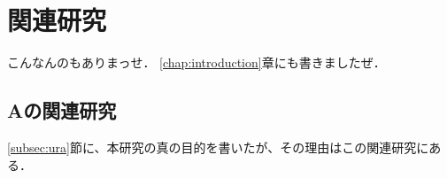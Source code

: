 \chapter{関連研究}\label{chap:relatedwork}

こんなんのもありまっせ．
\ref{chap:introduction}章にも書きましたぜ．

\section{Aの関連研究}
\label{sec:relatedworkA}

\ref{subsec:ura}節に、本研究の真の目的を書いたが、その理由はこの関連研究にある．

\newpage
